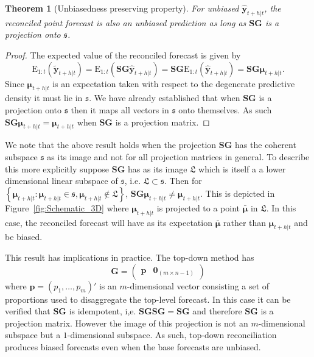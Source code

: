 \documentclass[12pt]{article}
\def\E{\text{E}}
\newtheorem{theo}{Theorem}[section]
\theoremstyle{definition}
\theoremstyle{property}
\begin{document}
	\begin{theo}[Unbiasedness preserving property]
		For unbiased $\hat{\bm{y}}_{t+h|t}$, the reconciled point forecast is also an unbiased prediction as long as $\bm{SG}$ is a projection onto $\mathfrak{s}$.
	\end{theo}
	\begin{proof}
		The expected value of the reconciled forecast is given by
		\[
		\E_{1:t}(\tilde{\bm{y}}_{t+h|t})
		= \E_{1:t}(\bm{S}\bm{G}\hat{\bm{y}}_{t+h|t})
		= \bm{S}\bm{G}\E_{1:t}(\hat{\bm{y}}_{t+h|t})
		= \bm{S}\bm{G}\bm{\mu}_{t+h|t}.
		\]
		Since $\bm{\mu}_{t+h|t}$ is an expectation taken with respect to the degenerate predictive density it must lie in $\mathfrak{s}$. We have already established that when $\bm{S}\bm{G}$ is a projection onto $\mathfrak{s}$ then it maps all vectors in $\mathfrak{s}$ onto themselves. As such $\bm{S}\bm{G}\bm{\mu}_{t+h|t}=\bm{\mu}_{t+h|t}$ when $\bm{S}\bm{G}$ is a projection matrix.
	\end{proof}

	We note that the above result holds when the projection $\bm{SG}$ has the coherent subspace $\mathfrak{s}$ as its image and not for all projection matrices in general. To describe this more explicitly suppose $\bm{SG}$ has as its image  $\mathfrak{L}$ which is itself a a lower dimensional linear subspace of $\mathfrak{s}$, i.e. $\mathfrak{L}\subset\mathfrak{s}$. Then for $\left\{\bm{\mu}_{t+h|t}:\bm{\mu}_{t+h|t}\in\mathfrak{s},\bm{\mu}_{t+h|t}\notin\mathfrak{L}\right\}$,  $\bm{S}\bm{G}\bm{\mu}_{t+h|t} \ne \bm{\mu}_{t+h|t}$. This is depicted in Figure~\ref{fig:Schematic_3D} where $\bm{\mu}_{t+h|t}$ is projected to a point $\bar{\bm{\mu}}$ in $\mathfrak{L}$.  In this case, the reconciled forecast will have as its expectation $\bar{\bm{\mu}}$ rather than $\bm{\mu}_{t+h|t}$ and be biased.  
	
	This result has implications in practice. The top-down method \citep{Gross1990} has 
	\begin{equation}\label{eq:top-downG}
	\bm{G}=\begin{pmatrix}
	\bm{p} & \bm{0}_{(m \times n-1)}
	\end{pmatrix}
	\end{equation}
    where $\bm{p} = (p_1,\dots,p_m)'$ is an $m$-dimensional vector consisting a set of proportions used to disaggregate the top-level forecast.  In this case it can be verified that $\bm{SG}$ is idempotent, i,e. $\bm{SGSG}=\bm{SG}$ and therefore $\bm{SG}$ is a projection matrix.  However the image of this projection is not an $m$-dimensional subspace but a $1$-dimensional subspace.  As such, top-down reconciliation produces biased forecasts even when the base forecasts are unbiased.
		
\end{document}
